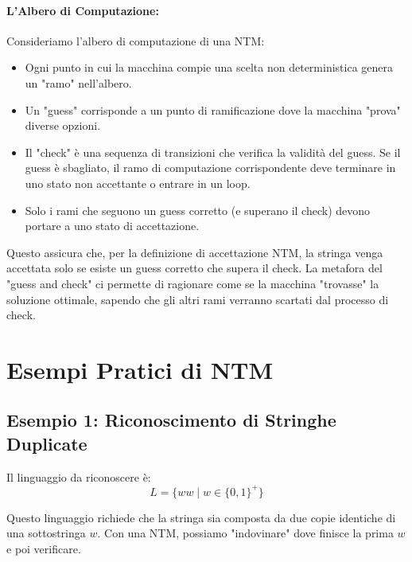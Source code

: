 \documentclass[a4paper]{article}
\theoremstyle{definition} %
\begin{document}
\paragraph{L'Albero di Computazione:}
Consideriamo l'albero di computazione di una NTM:
\begin{itemize}
    \item Ogni punto in cui la macchina compie una scelta non deterministica genera un "ramo" nell'albero.
    \item Un "guess" corrisponde a un punto di ramificazione dove la macchina "prova" diverse opzioni.
    \item Il "check" è una sequenza di transizioni che verifica la validità del guess. Se il guess è sbagliato, il ramo di computazione corrispondente deve terminare in uno stato non accettante o entrare in un loop.
    \item Solo i rami che seguono un guess corretto (e superano il check) devono portare a uno stato di accettazione.
\end{itemize}
Questo assicura che, per la definizione di accettazione NTM, la stringa venga accettata solo se esiste un guess corretto che supera il check. La metafora del "guess and check" ci permette di ragionare come se la macchina "trovasse" la soluzione ottimale, sapendo che gli altri rami verranno scartati dal processo di check.

\section{Esempi Pratici di NTM}

\subsection{Esempio 1: Riconoscimento di Stringhe Duplicate}

Il linguaggio da riconoscere è:
\begin{equation}
L = \{ww \mid w \in \{0,1\}^+\}
\end{equation}

Questo linguaggio richiede che la stringa sia composta da due copie identiche di una sottostringa $w$. Con una NTM, possiamo "indovinare" dove finisce la prima $w$ e poi verificare.
\end{document}
